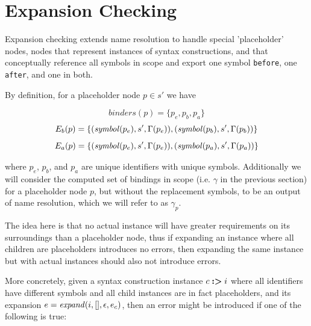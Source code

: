 \documentclass{kththesis}
\begin{document}

\section{Expansion Checking} \label{sec:expansion-checking-formalization}

Expansion checking extends name resolution to handle special 'placeholder' nodes, nodes that represent instances of syntax constructions, and that conceptually reference all symbols in scope and export one symbol \texttt{before}, one \texttt{after}, and one in both.

By definition, for a placeholder node $p \in s'$ we have

$$ binders(p) = \{p_e, p_b, p_a\} $$
$$ E_b(p) = \{(\mathit{symbol}(p_e), s', \Gamma(p_e)), (\mathit{symbol}(p_b), s', \Gamma(p_b))\} $$
$$ E_a(p) = \{(\mathit{symbol}(p_e), s', \Gamma(p_e)), (\mathit{symbol}(p_a), s', \Gamma(p_a))\} $$

where $p_e$, $p_b$, and $p_a$ are unique identifiers with unique symbols. Additionally we will consider the computed set of bindings in scope (i.e. $\gamma$ in the previous section) for a placeholder node $p$, but without the replacement symbols, to be an output of name resolution, which we will refer to as $\gamma_p$.

The idea here is that no actual instance will have greater requirements on its surroundings than a placeholder node, thus if expanding an instance where all children are placeholders introduces no errors, then expanding the same instance but with actual instances should also not introduce errors.

More concretely, given a syntax construction instance $c \mathrel{\textbf{:>}} i$ where all identifiers have different symbols and all child instances are in fact placeholders, and its expansion $e = \mathit{expand}(i, [], \epsilon, e_c)$, then an error might be introduced if one of the following is true:
\end{document}
